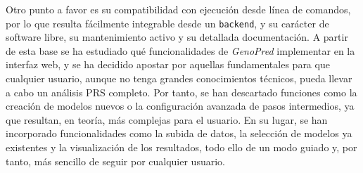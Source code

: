 Otro punto a favor es su compatibilidad con ejecución desde línea de comandos, por lo que resulta fácilmente integrable desde un \texttt{backend}, y su carácter de software libre, su mantenimiento activo y su detallada documentación. A partir de esta base se ha estudiado qué funcionalidades de \textit{GenoPred} implementar en la interfaz web, y se ha decidido apostar por aquellas fundamentales para que cualquier usuario, aunque no tenga grandes conocimientos técnicos, pueda llevar a cabo un análisis PRS completo. Por tanto, se han descartado funciones como la creación de modelos nuevos o la configuración avanzada de pasos intermedios, ya que resultan, en teoría, más complejas para el usuario. En su lugar, se han incorporado funcionalidades como la subida de datos, la selección de modelos ya existentes y la visualización de los resultados, todo ello de un modo guiado y, por tanto, más sencillo de seguir por cualquier usuario. 

